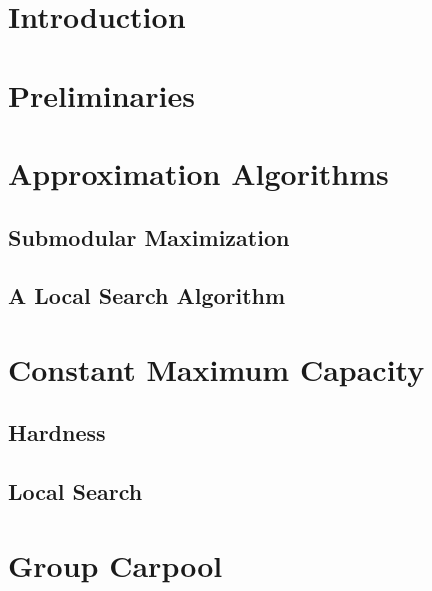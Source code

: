 \begin{abstract}

\end{abstract}

\section{Introduction}


\section{Preliminaries}
\label{sec:pre}


\section{Approximation Algorithms}
\label{sec:approx}


\subsection{Submodular Maximization}
\label{sec:sub}


\subsection{A Local Search Algorithm}


\section{Constant Maximum Capacity}

	\subsection{Hardness}
	\label{sec:hardness}
	

	\subsection{Local Search}
	\label{sec:local}
	

\section{Group Carpool}
\label{sec:group}


